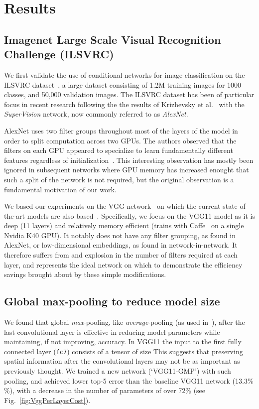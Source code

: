 \documentclass[thesis]{subfiles}
\begin{document}
	\section{Results}
	
	\subsection{Imagenet Large Scale Visual Recognition Challenge (ILSVRC)}
	We first validate the use of conditional networks for image classification on the ILSVRC dataset~\citep{ILSVRC2015}, a large dataset consisting of 1.2M training images for 1000 classes, and 50,000 validation images. The ILSVRC dataset has been of particular focus in recent research following the the results of Krizhevsky et al.~\citep{Krizhevsky2012imanet} with the \emph{SuperVision} network, now commonly referred to as \emph{AlexNet}.
	
	AlexNet uses two filter groups throughout most of the layers of the model in order to split computation across two GPUs. The authors observed that the filters on each GPU appeared to specialize to learn fundamentally different features regardless of initialization~\citep{Krizhevsky2012imanet}. This interesting observation has mostly been ignored in subsequent networks where GPU memory has increased enought that such a split of the network is not required, but the original observation is a fundamental motivation of our work.
	
	We based our experiments on the VGG network~\citep{Simonyan2014verydeep} on which the current state-of-the-art models are also based~\citep{He2015b}. Specifically, we focus on the VGG11 model as it is deep (11 layers) and relatively memory efficient (trains with Caffe~\citep{Jia2014} on a single Nvidia K40 GPU). It notably does not have any filter grouping, as found in AlexNet, or low-dimensional embeddings, as found in network-in-network. It therefore suffers from and explosion in the number of filters required at each layer, and represents the ideal network on which to demonstrate the efficiency savings brought about by these simple modifications.
	
	\subsection{Global max-pooling to reduce model size}
	We found that global {\em max}-pooling, like 
	{\em average}-pooling (as used in~\citep{Lin2013NiN,Szegedy2014going}), after the last convolutional layer is effective in reducing model parameters while maintaining, if not improving, accuracy. In VGG11 the input to the first fully connected layer (\ie \texttt{fc7}) consists of a tensor of size 
	This suggests that preserving spatial information after the convolutional layers may not be as important as previously thought. 
	We trained a new network (`VGG11-GMP') with such pooling, and achieved lower top-5 error than the baseline VGG11 
	network (13.3\% \%), with a decrease in the number of parameters of over 72\% (see Fig.~\ref{fig:VggPerLayerCost}).
	
\end{document}

